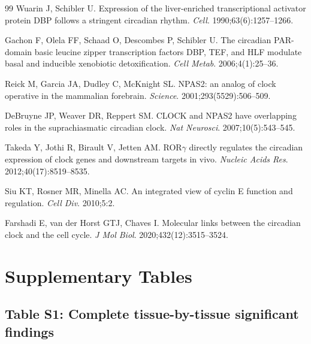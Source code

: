 \documentclass[11pt,letterpaper]{article}
\begin{document}
\begin{thebibliography}{99}
Wuarin J, Schibler U. Expression of the liver-enriched transcriptional activator protein DBP follows a stringent circadian rhythm. \textit{Cell}. 1990;63(6):1257--1266.

Gachon F, Olela FF, Schaad O, Descombes P, Schibler U. The circadian PAR-domain basic leucine zipper transcription factors DBP, TEF, and HLF modulate basal and inducible xenobiotic detoxification. \textit{Cell Metab}. 2006;4(1):25--36.

Reick M, Garcia JA, Dudley C, McKnight SL. NPAS2: an analog of clock operative in the mammalian forebrain. \textit{Science}. 2001;293(5529):506--509.

DeBruyne JP, Weaver DR, Reppert SM. CLOCK and NPAS2 have overlapping roles in the suprachiasmatic circadian clock. \textit{Nat Neurosci}. 2007;10(5):543--545.

Takeda Y, Jothi R, Birault V, Jetten AM. ROR$\gamma$ directly regulates the circadian expression of clock genes and downstream targets in vivo. \textit{Nucleic Acids Res}. 2012;40(17):8519--8535.

Siu KT, Rosner MR, Minella AC. An integrated view of cyclin E function and regulation. \textit{Cell Div}. 2010;5:2.

Farshadi E, van der Horst GTJ, Chaves I. Molecular links between the circadian clock and the cell cycle. \textit{J Mol Biol}. 2020;432(12):3515--3524.

\end{thebibliography}

\newpage
\section*{Supplementary Tables}

\subsection*{Table S1: Complete tissue-by-tissue significant findings}
\end{document}
